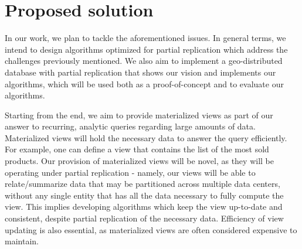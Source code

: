 %

\section{Proposed solution}


In our work, we plan to tackle the aforementioned issues.
In general terms, we intend to design algorithms optimized for partial replication which address the challenges previously mentioned.
We also aim to implement a geo-distributed database with partial replication that shows our vision and implements our algorithms, which will be used both as a proof-of-concept and to evaluate our algorithms.

Starting from the end, we aim to provide materialized views \cite{viewSelection} as part of our answer to recurring, analytic queries regarding large amounts of data.
Materialized views will hold the necessary data to answer the query efficiently.
For example, one can define a view that contains the list of the most sold products.
Our provision of materialized views will be novel, as they will be operating under partial replication - namely, our views will be able to relate/summarize data that may be partitioned across multiple data centers, without any single entity that has all the data necessary to fully compute the view.
This implies developing algorithms which keep the view up-to-date and consistent, despite partial replication of the necessary data.
Efficiency of view updating is also essential, as materialized views are often considered expensive to maintain. %


